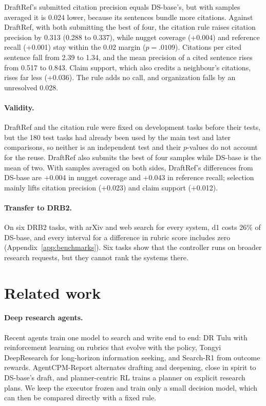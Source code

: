 \documentclass[11pt, letterpaper]{article}
\begin{document}
DraftRef's submitted citation precision equals DS-base's, but with samples averaged it is 0.024
lower, because its sentences bundle more citations. Against DraftRef, with both submitting the best
of four, the citation rule raises citation precision by 0.313 (0.288 to 0.337), while nugget
coverage (+0.004) and reference recall (+0.001) stay within the 0.02 margin ($p = .0109$).
Citations per cited sentence fall from 2.39 to 1.34, and the mean precision of a cited sentence
rises from 0.517 to 0.843. Claim support, which also credits a neighbour's citations, rises far less
(+0.036). The rule adds no call, and organization falls by an unresolved 0.028.

\paragraph{Validity.} DraftRef and the citation rule were fixed on development tasks before their
tests, but the 180 test tasks had already been used by the main test and later comparisons, so
neither is an independent test and their $p$-values do not account for the reuse. DraftRef also
submits the best of four samples while DS-base is the mean of two. With samples averaged on both
sides, DraftRef's differences from DS-base are +0.004 in nugget coverage and +0.043 in reference
recall; selection mainly lifts citation precision (+0.023) and claim support (+0.012).

\paragraph{Transfer to DRB2.} On six DRB2 tasks, with arXiv and web search for every system, d1 costs
26\% of DS-base, and every interval for a difference in rubric score includes zero
(Appendix~\ref{app:benchmarks}). Six tasks show that the controller runs on broader research
requests, but they cannot rank the systems there.

\section{Related work}

\paragraph{Deep research agents.} Recent agents train one model to search and write end to end: DR
Tulu \cite{shao2026drtulu} with reinforcement learning on rubrics that evolve with the policy, Tongyi
DeepResearch \cite{tongyi2025deepresearch} for long-horizon information seeking, and Search-R1
\cite{jin2025searchr1} from outcome rewards. AgentCPM-Report \cite{li2026agentcpm} alternates
drafting and deepening, close in spirit to DS-base's draft, and planner-centric RL
\cite{hussain2026planner} trains a planner on explicit research plans. We keep the executor frozen
and train only a small decision model, which can then be compared directly with a fixed rule.
\end{document}
